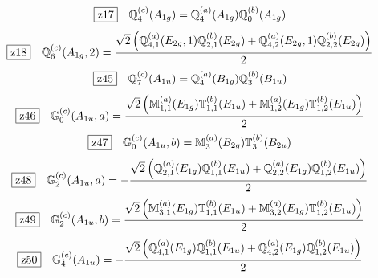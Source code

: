 \documentclass[fleqn,10pt,landscape]{jsarticle}
\begin{document}
\begin{dmath*}
\hspace*{3mm}\fbox{z17}\quad \mathbb{Q}_{4}^{(c)}(A_{1g})=\mathbb{Q}_{4}^{(a)}(A_{1g}) \mathbb{Q}_{0}^{(b)}(A_{1g})
\end{dmath*}
\begin{dmath*}
\hspace*{3mm}\fbox{z18}\quad \mathbb{Q}_{6}^{(c)}(A_{1g},2)=\frac{\sqrt{2} \left(\mathbb{Q}_{4,1}^{(a)}(E_{2g},1) \mathbb{Q}_{2,1}^{(b)}(E_{2g}) + \mathbb{Q}_{4,2}^{(a)}(E_{2g},1) \mathbb{Q}_{2,2}^{(b)}(E_{2g})\right)}{2}
\end{dmath*}
\begin{dmath*}
\hspace*{3mm}\fbox{z45}\quad \mathbb{Q}_{7}^{(c)}(A_{1u})=\mathbb{Q}_{4}^{(a)}(B_{1g}) \mathbb{Q}_{3}^{(b)}(B_{1u})
\end{dmath*}
\begin{dmath*}
\hspace*{3mm}\fbox{z46}\quad \mathbb{G}_{0}^{(c)}(A_{1u},a)=\frac{\sqrt{2} \left(\mathbb{M}_{1,1}^{(a)}(E_{1g}) \mathbb{T}_{1,1}^{(b)}(E_{1u}) + \mathbb{M}_{1,2}^{(a)}(E_{1g}) \mathbb{T}_{1,2}^{(b)}(E_{1u})\right)}{2}
\end{dmath*}
\begin{dmath*}
\hspace*{3mm}\fbox{z47}\quad \mathbb{G}_{0}^{(c)}(A_{1u},b)=\mathbb{M}_{3}^{(a)}(B_{2g}) \mathbb{T}_{3}^{(b)}(B_{2u})
\end{dmath*}
\begin{dmath*}
\hspace*{3mm}\fbox{z48}\quad \mathbb{G}_{2}^{(c)}(A_{1u},a)=- \frac{\sqrt{2} \left(\mathbb{Q}_{2,1}^{(a)}(E_{1g}) \mathbb{Q}_{1,1}^{(b)}(E_{1u}) + \mathbb{Q}_{2,2}^{(a)}(E_{1g}) \mathbb{Q}_{1,2}^{(b)}(E_{1u})\right)}{2}
\end{dmath*}
\begin{dmath*}
\hspace*{3mm}\fbox{z49}\quad \mathbb{G}_{2}^{(c)}(A_{1u},b)=\frac{\sqrt{2} \left(\mathbb{M}_{3,1}^{(a)}(E_{1g}) \mathbb{T}_{1,1}^{(b)}(E_{1u}) + \mathbb{M}_{3,2}^{(a)}(E_{1g}) \mathbb{T}_{1,2}^{(b)}(E_{1u})\right)}{2}
\end{dmath*}
\begin{dmath*}
\hspace*{3mm}\fbox{z50}\quad \mathbb{G}_{4}^{(c)}(A_{1u})=- \frac{\sqrt{2} \left(\mathbb{Q}_{4,1}^{(a)}(E_{1g}) \mathbb{Q}_{1,1}^{(b)}(E_{1u}) + \mathbb{Q}_{4,2}^{(a)}(E_{1g}) \mathbb{Q}_{1,2}^{(b)}(E_{1u})\right)}{2}
\end{dmath*}
\end{document}
